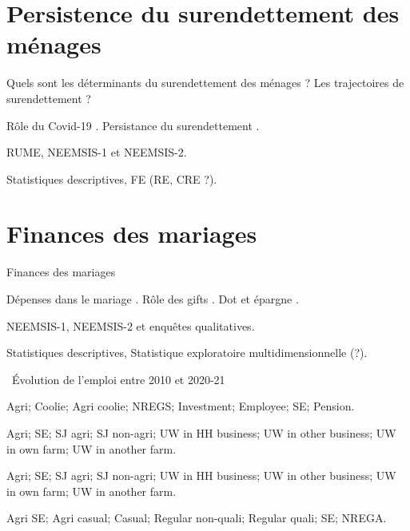 \documentclass[aspectratio=169]{beamer}
\begin{document}
\section{Persistence du surendettement des ménages}
\begin{frame}{Quels sont les déterminants du surendettement des ménages ? Les trajectoires de surendettement ?}
    \begin{vfilleditems}
        \item[\faBook] Rôle du Covid-19 \citep{Guerin2021}. Persistance du surendettement \citep{Chichaibelu2018}.
        \item[\faDatabase] RUME, NEEMSIS-1 et NEEMSIS-2.
		\item[\faIndustry] Statistiques descriptives, FE (RE, CRE ?).
    \end{vfilleditems}
\end{frame}







\section{Finances des mariages}
\begin{frame}{Finances des mariages}
    \begin{vfilleditems}
        \item[\faBook] Dépenses dans le mariage \citep{Bloch2004}. Rôle des gifts \citep{Guerin2020c}. Dot et épargne \citep{Anukriti2020}.
        \item[\faDatabase] NEEMSIS-1, NEEMSIS-2 et enquêtes qualitatives.
		\item[\faIndustry] Statistiques descriptives, Statistique exploratoire multidimensionnelle (?). 
    \end{vfilleditems}
\end{frame}






\begin{frame}{\faCommentsO ~Évolution de l'emploi entre 2010 et 2020-21}
    \begin{vfilleditems}
        \item[2010] Agri; Coolie; Agri coolie; NREGS; Investment; Employee; SE; Pension.
        \item[2016] Agri; SE; SJ agri; SJ non-agri; UW in HH business; UW in other business; UW in own farm; UW in another farm.
        \item[2020] Agri; SE; SJ agri; SJ non-agri; UW in HH business; UW in other business; UW in own farm; UW in another farm.
        \item[Panel] Agri SE; Agri casual; Casual; Regular non-quali; Regular quali; SE; NREGA.
    \end{vfilleditems}
\end{frame}
\end{document}
